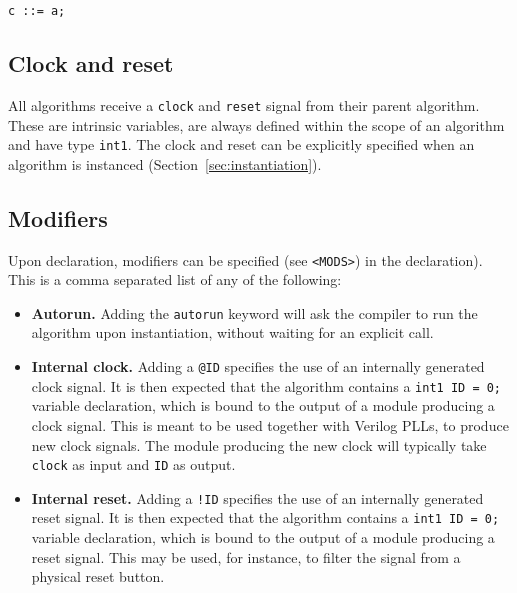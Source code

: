 \documentclass[a4]{article}
\newcommand\verilog{Verilog}
\begin{document}
\begin{verbatim}
c ::= a;
\end{verbatim}


\subsection{Clock and reset}

All algorithms receive a \texttt{clock} and \texttt{reset} signal from their
parent algorithm. These are intrinsic variables, are always defined within
the scope of an algorithm and have type \texttt{int1}. The clock and reset
can be explicitly specified when an algorithm is instanced (Section~\ref{sec:instantiation}).


\subsection{Modifiers}

Upon declaration, modifiers can be specified (see \texttt{<MODS>}) in the declaration). This is a comma separated list of any of the following:

\begin{itemize}
	\item \textbf{Autorun.} Adding the \texttt{autorun} keyword will ask the compiler to run the algorithm upon instantiation, without waiting for an explicit call.
	\item \textbf{Internal clock.} Adding a \texttt{@ID} specifies the use of an internally generated clock signal. It is then expected that the algorithm contains a \texttt{int1 ID = 0;} variable declaration, which is bound to the output of a module producing a clock signal. This is meant to be used together with \verilog{} PLLs, to produce new clock signals. The module producing the new clock will typically take \texttt{clock} as input and \texttt{ID}
	as output.
	\item \textbf{Internal reset.} Adding a \texttt{!ID} specifies the use of an internally generated reset signal. It is then expected that the algorithm contains a \texttt{int1 ID = 0;} variable declaration, which is bound to the output of a module producing a reset signal. This may be used, for instance, to filter the signal from a physical reset button.
\end{itemize}
\end{document}
